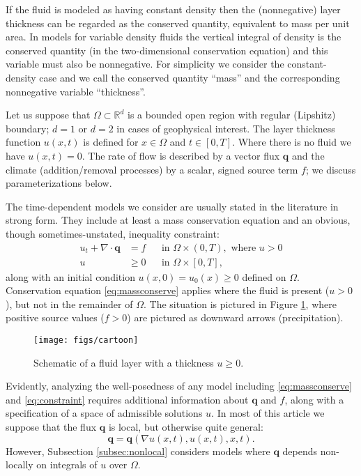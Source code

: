 \documentclass[final,onefignum]{siamart190516}
\newcommand\bq{\mathbf{q}}
\newcommand{\Div}{\nabla\cdot}
\newcommand{\grad}{\nabla}
\newcommand\RR{\mathbb{R}}
\begin{document}
If the fluid is modeled as having constant density then the (nonnegative) layer thickness can be regarded as the conserved quantity, equivalent to mass per unit area.  In models for variable density fluids the vertical integral of density is the conserved quantity (in the two-dimensional conservation equation) and this variable must also be nonnegative.  For simplicity we consider the constant-density case and we call the conserved quantity ``mass'' and the corresponding nonnegative variable ``thickness''.

Let us suppose that $\Omega \subset \RR^d$ is a bounded open region with regular (Lipshitz) boundary; $d=1$ or $d=2$ in cases of geophysical interest.  The layer thickness function $u(x,t)$ is defined for $x\in \Omega$ and $t \in [0,T]$.  Where there is no fluid we have $u(x,t)=0$.  The rate of flow is described by a vector flux $\bq$ and the climate (addition/removal processes) by a scalar, signed source term $f$; we discuss parameterizations below.

The time-dependent models we consider are usually stated in the literature in strong form.  They include at least a mass conservation equation and an obvious, though sometimes-unstated, inequality constraint:
\begin{align}
u_t + \Div \bq &= f &&\text{in } \Omega \times (0,T), \text{ where } u > 0 \label{eq:massconserve} \\
u &\ge 0 &&\text{in } \Omega \times [0,T], \label{eq:constraint}
\end{align}
along with an initial condition $u(x,0)=u_0(x)\ge 0$ defined on $\Omega$.  Conservation equation \eqref{eq:massconserve} applies where the fluid is present ($u>0$), but not in the remainder of $\Omega$.  The situation is pictured in Figure \ref{fig:cartoon}, where positive source values ($f>0$) are pictured as downward arrows (precipitation).

\begin{figure}[ht]
\centerline{\texttt{[image: figs/cartoon]}}
\caption{Schematic of a fluid layer with a thickness $u\ge 0$.}
\label{fig:cartoon}
\end{figure}

Evidently, analyzing the well-posedness of any model including \eqref{eq:massconserve} and \eqref{eq:constraint} requires additional information about $\bq$ and $f$, along with a specification of a space of admissible solutions $u$.  In most of this article we suppose that the flux $\bq$ is local, but otherwise quite general:
\begin{equation}
\bq = \bq(\grad u(x,t),u(x,t),x,t). \label{eq:fluxdepends}
\end{equation}
However, Subsection \ref{subsec:nonlocal} considers models where $\bq$ depends non-locally on integrals of $u$ over $\Omega$.
\end{document}
